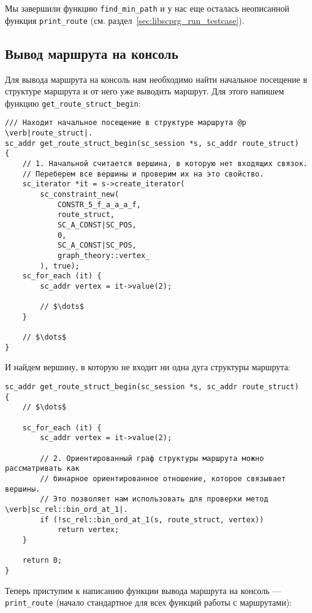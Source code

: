 Мы завершили функцию \lstinline|find_min_path| и у нас еще осталась
неописанной функция \lstinline|print_route|
(см. раздел~\ref{sec:libscprg_run_testcase}).

\subsection{Вывод маршрута на консоль}
\label{sec:libscprg_fmp_print_route}

Для вывода маршрута на консоль нам необходимо найти начальное
посещение в структуре маршрута и от него уже выводить маршрут. Для
этого напишем функцию \lstinline|get_route_struct_begin|:

\begin{lstlisting}[texcl]
/// Находит начальное посещение в структуре маршрута @p \verb|route_struct|.
sc_addr get_route_struct_begin(sc_session *s, sc_addr route_struct)
{
    // 1. Начальной считается вершина, в которую нет входящих связок.
    // Переберем все вершины и проверим их на это свойство.
    sc_iterator *it = s->create_iterator(
        sc_constraint_new(
            CONSTR_5_f_a_a_a_f,
            route_struct,
            SC_A_CONST|SC_POS,
            0,
            SC_A_CONST|SC_POS,
            graph_theory::vertex_
        ), true);
    sc_for_each (it) {
        sc_addr vertex = it->value(2);

        // $\dots$
    }

    // $\dots$
}
\end{lstlisting}

И найдем вершину, в которую не входит ни одна дуга структуры маршрута:

\begin{lstlisting}[texcl]
sc_addr get_route_struct_begin(sc_session *s, sc_addr route_struct)
{
    // $\dots$

    sc_for_each (it) {
        sc_addr vertex = it->value(2);

        // 2. Ориентированный граф структуры маршрута можно рассматривать как
        // бинарное ориентированное отношение, которое связывает вершины.
        // Это позволяет нам использовать для проверки метод \verb|sc_rel::bin_ord_at_1|.
        if (!sc_rel::bin_ord_at_1(s, route_struct, vertex))
            return vertex;
    }

    return 0;
}
\end{lstlisting}

Теперь приступим к написанию функции вывода маршрута на консоль ---
\lstinline|print_route| (начало стандартное для всех функций работы с
маршрутами):

